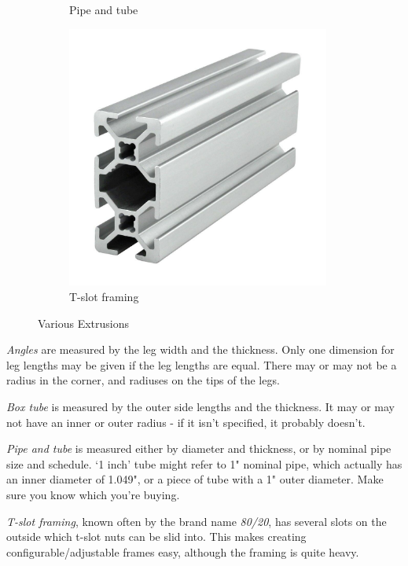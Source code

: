 \documentclass[10pt,letterpaper]{book}
\begin{document}
\begin{figure}[H]
\begin{subfigure}[b]{.24\linewidth}
		\caption{Pipe and tube}
	\end{subfigure}	\begin{subfigure}[b]{.24\linewidth}
		\includegraphics[width=0.95\textwidth]{imgs/extrusion_8020.jpeg}
		\caption{T-slot framing}
	\end{subfigure}	
	\caption{Various Extrusions}
\end{figure}

 \begin{asparaenum}[a)]
 	\item \textit{Angles} are measured by the leg width and the thickness. Only one dimension for leg lengths may be given if the leg lengths are equal. There may or may not be a radius in the corner, and radiuses on the tips of the legs.
 	\item \textit{Box tube} is measured by the outer side lengths and the thickness. It may or may not have an inner or outer radius - if it isn't specified, it probably doesn't.
 	\item \textit{Pipe and tube} is measured either by diameter and thickness, or by nominal pipe size and schedule. `1 inch' tube might refer to 1" nominal pipe, which actually has an inner diameter of 1.049", or a piece of tube with a 1" outer diameter. Make sure you know which you're buying.
 	\item \textit{T-slot framing}, known often by the brand name \textit{80/20}, has several slots on the outside which t-slot nuts can be slid into. This makes creating configurable/adjustable frames easy, although the framing is quite heavy. 
 \end{asparaenum}
 
\end{document}
